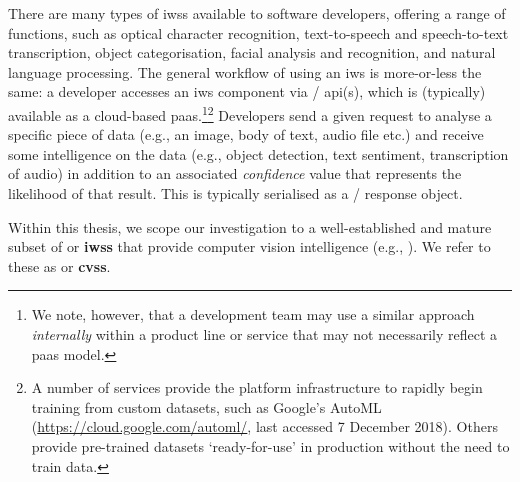 There are many types of \glspl{iws} available to software developers, offering a range of functions, such as optical character recognition, text-to-speech and speech-to-text transcription, object categorisation, facial analysis and recognition, and natural language processing. The general workflow of using an \gls{iws} is more-or-less the same: a developer accesses an \gls{iws} component via / \gls{api}(s), which is (typically) available as a cloud-based \gls{paas}.\footnote{We note, however, that a development team may use a similar approach \textit{internally} within a product line or service that may not necessarily reflect a \gls{paas} model.}\footnote{A number of services provide the platform infrastructure to rapidly begin training from custom datasets, such as Google's AutoML (\url{https://cloud.google.com/automl/}, last accessed 7 December 2018). Others provide pre-trained datasets `ready-for-use' in production without the need to train data.} Developers send a given request to analyse a specific piece of data (e.g., an image, body of text, audio file etc.) and receive some intelligence on the data (e.g., object detection, text sentiment, transcription of audio) in addition to an associated \textit{confidence} value that represents the likelihood of that result. This is typically serialised as a / response object. 


\begin{callout}
Within this thesis, we scope our investigation to a well-established and mature \textup{subset} of \textbf{} or \textbf{\glspl{iws}} that provide computer vision intelligence (e.g., ). We refer to these as \textbf{} or \textbf{\glspl{cvs}}. 
\end{callout}





